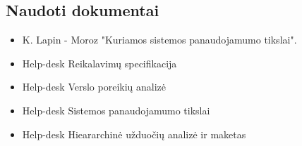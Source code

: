 	\subsection{Naudoti dokumentai}
	
	\begin{itemize}
	\item K. Lapin - Moroz "Kuriamos sistemos panaudojamumo tikslai".
	\item Help-desk Reikalavimų specifikacija
	\item Help-desk Verslo poreikių analizė
	\item Help-desk Sistemos panaudojamumo tikslai
	\item Help-desk Hieararchinė užduočių analizė ir maketas
	\end{itemize}
	